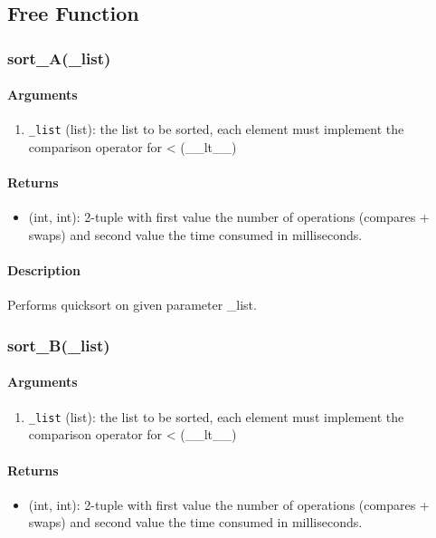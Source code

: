 \subsection{Free Function}
\subsubsection{sort\_A(\_list)}
\paragraph*{Arguments}
\begin{enumerate}
    \item \texttt{\_list} (list): the list to be sorted, each element must implement the comparison operator for < (\_\_lt\_\_)
\end{enumerate}
\paragraph*{Returns}
\begin{itemize}
    \item (int, int): 2-tuple with first value the number of operations (compares + swaps) and second value the time consumed in milliseconds.
\end{itemize}
\paragraph*{Description}
Performs quicksort on given parameter \_list.
\subsubsection{sort\_B(\_list)}
\paragraph*{Arguments}
\begin{enumerate}
    \item \texttt{\_list} (list): the list to be sorted, each element must implement the comparison operator for < (\_\_lt\_\_)
\end{enumerate}
\paragraph*{Returns}
\begin{itemize}
    \item (int, int): 2-tuple with first value the number of operations (compares + swaps) and second value the time consumed in milliseconds.
\end{itemize}
